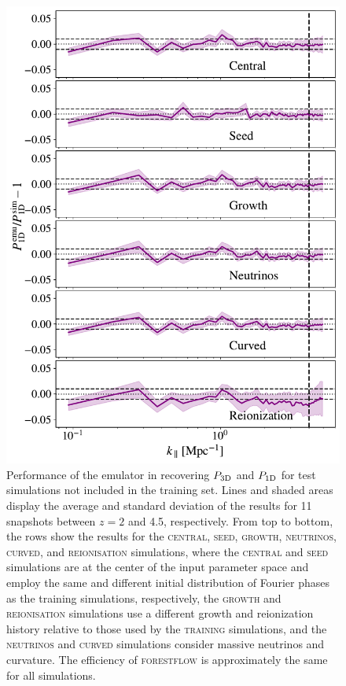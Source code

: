 \documentclass[longauth]{aa}
\newcommand{\poned}{\ensuremath{P_{\rm 1D}}\xspace}
\newcommand{\pthreed}{\ensuremath{P_{\rm 3D}}\xspace}
\newcommand{\forestflow}{\textsc{forestflow}\xspace}
\newcommand{\lacehc}{\textsc{training}\xspace}
\newcommand{\simseed}{\textsc{seed}\xspace}
\newcommand{\simigm}{\textsc{reionisation}\xspace}
\newcommand{\simcurved}{\textsc{curved}\xspace}
\newcommand{\simh}{\textsc{growth}\xspace}
\newcommand{\simnu}{\textsc{neutrinos}\xspace}
\newcommand{\simcentral}{\textsc{central}\xspace}
\begin{document}
\begin{figure}
\includegraphics[width= 0.96\columnwidth]{figures/test_cosmo_P1D.pdf}
\centering
\caption{Performance of the emulator in recovering \pthreed and \poned for test simulations not included in the training set. Lines and shaded areas display the average and standard deviation of the results for 11 snapshots between $z=2$ and 4.5, respectively. From top to bottom, the rows show the results for the \simcentral, \simseed, \simh, \simnu, \simcurved, and \simigm simulations, where the \simcentral and \simseed simulations are at the center of the input parameter space and employ the same and different initial distribution of Fourier phases as the training simulations, respectively, the \simh and \simigm simulations use a different growth and reionization history relative to those used by the \lacehc simulations, and the \simnu and \simcurved simulations consider massive neutrinos and curvature. The efficiency of \forestflow is approximately the same for all simulations.}
\label{fig:other_cosmo}
\end{figure}
\end{document}
